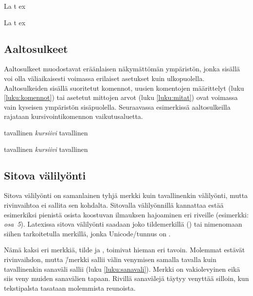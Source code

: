\begin{koodilohkosis}
  La%
    t%
      ex
\end{koodilohkosis}

\begin{tulossis}
  La%
    t%
      ex
\end{tulossis}

\subsection{Aaltosulkeet}
\label{luku:aaltosulkeet}

Aaltosulkeet \mbox{\koodi{\{\}}} muodostavat eräänlaisen näkymättömän
ympäristön, jonka sisällä voi olla väliaikaisesti voimassa erilaiset
asetukset kuin ulkopuolella. Aaltosulkeiden sisällä suoritetut komennot,
uusien komentojen määrittelyt (luku \ref{luku:komennot}) tai asetetut
mittojen arvot (luku \ref{luku:mitat}) ovat voimassa vain kyseisen
ympäristön sisäpuolella. Seuraavassa esimerkissä aaltosulkeilla rajataan
kursivointikomennon  vai\-ku\-tus\-aluetta.

\pagebreak[3]

\begin{koodilohkosis}
  tavallinen {\itshape kursiivi} tavallinen
\end{koodilohkosis}

\begin{tulossis}
  tavallinen {\itshape kursiivi} tavallinen
\end{tulossis}

\subsection{Sitova välilyönti}

Sitova välilyönti on samanlainen tyhjä merkki kuin tavallinenkin
välilyönti, mutta rivinvaihtoa ei sallita sen kohdalta. Sitovalla
välilyönnillä kannattaa estää esimerkiksi pienistä osista koostuvan
ilmauksen hajoaminen eri riveille (esimerkki: \emph{osa~5}). Latexissa
sitova välilyönti saadaan joko tildemerkillä (\koodi{\textasciitilde})
tai nimenomaan siihen tarkoitetulla merkillä, jonka Unicode\-/tunnus on
.

Nämä kaksi eri merkkiä, tilde ja , toimivat hieman eri
tavoin. Molemmat estävät rivinvaihdon, mutta
\koodi{\textasciitilde}\=/merkki sallii välin venymisen samalla tavalla
kuin tavallinenkin sanaväli sallii (luku \ref{luku:sanavali}). Merkki
 on vakiolevyinen eikä siis veny muiden sanavälien
tapaan. Rivillä sanavälejä täytyy venyttää silloin, kun tekstipalsta
tasataan molemmista reunoista.

